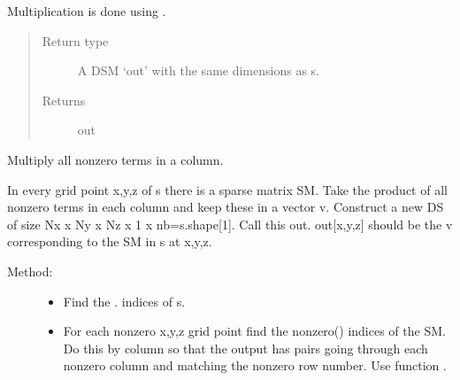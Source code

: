 \documentclass[letterpaper,10pt,english]{sphinxmanual}
\begin{document}
\begin{fulllineitems}
\begin{fulllineitems}
Multiplication is done using     {\hyperref[\detokenize{index:DictionarySparseMatrix.DS}]{}}. 
\begin{quote}\begin{description}
\item[{Return type}] \leavevmode
A DSM ‘out’ with the same dimensions as s.

\item[{Returns}] \leavevmode
out

\end{description}\end{quote}

\end{fulllineitems}


\begin{fulllineitems}
\label{\detokenize{index:DictionarySparseMatrix.DS.double_dict_col_mult_}}
Multiply all nonzero terms in a column.

In every grid point x,y,z of s there is a sparse matrix SM.     Take the product of all nonzero terms in each column and     keep these in a vector v.
Construct a new DS of size Nx x Ny x Nz x 1 x nb=s.shape{[}1{]}.    Call this out. out{[}x,y,z{]} should be the v corresponding     to the SM in s at x,y,z.
\begin{description}
\item[{Method:}] \leavevmode\begin{itemize}
\item {} 
Find the {\hyperref[\detokenize{index:DictionarySparseMatrix.DS}]{}}. {\hyperref[\detokenize{index:DictionarySparseMatrix.DS.nonzero}]{}} indices of s.

\item {} 
For each nonzero x,y,z grid point find the       nonzero() indices of the SM. Do this by column so       that the output has pairs going through       each nonzero column and matching the nonzero row       number. Use function {\hyperref[\detokenize{index:DictionarySparseMatrix.nonzero_bycol}]{}}.


\end{itemize}
\end{description}
\end{fulllineitems}
\end{fulllineitems}
\end{document}
